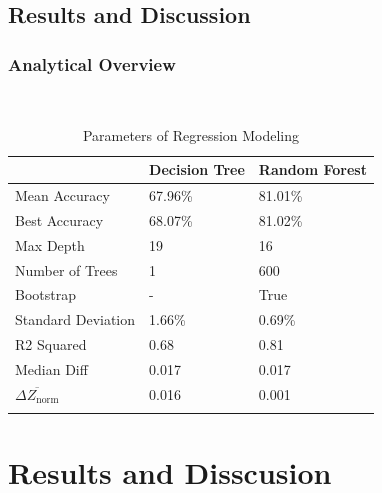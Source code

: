 \documentclass{beamer}
\begin{document}
\subsection{Results and Discussion}

\begin{frame}
	\frametitle{Analytical Overview}
    \begin{table}[ht]\
        \caption*{Parameters of Regression Modeling} %
        \centering %
        \begin{tabular}{l l l} %
        \hline\hline %
         &Decision Tree & Random Forest\\ [0.5ex] %
        \hline %
        Mean Accuracy& 67.96\%  & 81.01\%  \\ %
        Best Accuracy & 68.07\% & 81.02\%  \\
        Max Depth & 19 & 16  \\
        Number of Trees &  1 & 600  \\
        Bootstrap &  - & True  \\
        Standard Deviation &   1.66\% & 0.69\%  \\
        R2 Squared &  0.68 & 0.81  \\
        Median Diff &  0.017 & 0.017  \\ %
        $\overline{\Delta Z_{\text {norm}}}$ &  0.016 & 0.001  \\ [1ex] %
        \hline %
        \\
        \end{tabular}
        \end{table}
        \end{frame}
\section{Results and Disscusion}
\end{document}
